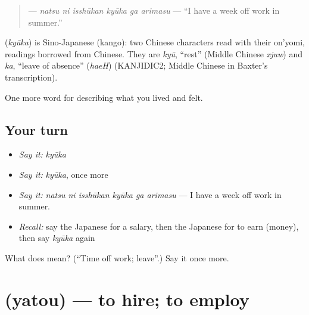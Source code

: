 \begin{quote}
\textbf{   } — \emph{natsu ni isshūkan kyūka ga arimasu} — \textquotedblleft{}I have a week off work in summer.\textquotedblright{}
\end{quote}

\begin{cousinweb}
\textbf{} (\emph{kyūka}) is Sino-Japanese (kango): two Chinese characters read with their on'yomi, readings borrowed from Chinese. They are \emph{kyū}, \textquotedblleft{}rest\textquotedblright{} (Middle Chinese \emph{xjuw}) and \emph{ka}, \textquotedblleft{}leave of absence\textquotedblright{} (\emph{haeH}) (KANJIDIC2; Middle Chinese in Baxter's transcription).
\end{cousinweb}

\begin{grammarlens}[title={What you've built}]
One more word for describing what you lived and felt.
\end{grammarlens}

\subsection*{Your turn}
\begin{itemize}
\raggedright
  \item \emph{Say it:} \emph{kyūka}
  \item \emph{Say it:} \emph{kyūka}, once more
  \item \emph{Say it:} \emph{natsu ni isshūkan kyūka ga arimasu} — I have a week off work in summer.
  \item \emph{Recall:} say the Japanese for a salary, then the Japanese for to earn (money), then say \emph{kyūka} again
\end{itemize}

\begin{tcolorbox}[breakable,colback=teal!4,colframe=teal!35!black,title={Before you move on}]
What does  mean? (\textquotedblleft{}Time off work; leave\textquotedblright{}.) Say it once more.
\end{tcolorbox}
\section[\texorpdfstring{\ja{やとう} (yatou)}{やとう (yatou)}]{ (yatou) — to hire; to employ}

\label{lesson:JA-C456-yatou}



